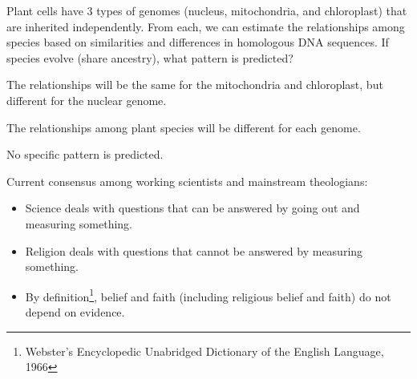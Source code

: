 \begin{frame}
    \begin{clickerquestion}
        \item Plant cells have 3 types of genomes (nucleus, mitochondria, and
            chloroplast) that are inherited independently. From each, we can
            estimate the relationships among
            species based on similarities and differences in homologous DNA
            sequences. If species evolve (share ancestry), what pattern
            is predicted?
        \begin{clickeroptions}
            \item The relationships will be the same for the mitochondria and
                chloroplast, but different for the nuclear genome. 

            \item The relationships among plant species will be different for
                each genome.

            \item {}

            \item No specific pattern is predicted. 
        \end{clickeroptions}
    \end{clickerquestion}
\end{frame}

\begin{frame}
    Current consensus among working scientists and mainstream theologians:

    \begin{itemize}
        \item<2-> Science deals with questions that can be answered by going out
            and measuring something.
        \item<3-> Religion deals with questions that cannot be answered by
            measuring something. 
        \item<4-> By definition\footnote{\scriptsize Webster’s Encyclopedic Unabridged
                Dictionary of the English Language, 1966}, belief and faith
            (including religious belief and faith) do not depend on evidence. 
    \end{itemize}
\end{frame}

